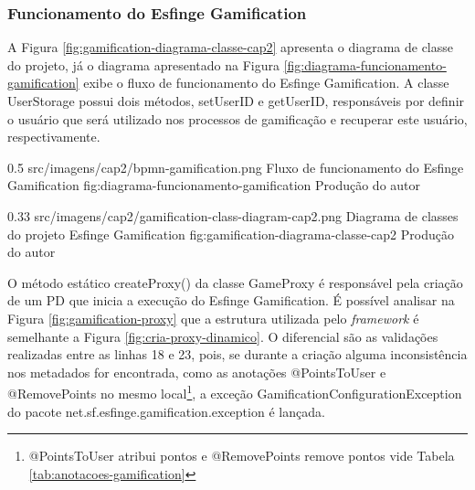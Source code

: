 \subsubsection{Funcionamento do Esfinge Gamification}

\par A Figura \ref{fig:gamification-diagrama-classe-cap2} apresenta o diagrama de classe do projeto, já o diagrama apresentado na Figura \ref{fig:diagrama-funcionamento-gamification} exibe o fluxo de funcionamento do Esfinge Gamification. A classe 
UserStorage possui dois métodos, setUserID e getUserID, responsáveis por definir o usuário que será utilizado nos processos de gamificação e recuperar este usuário, respectivamente.

\begin{image}
{0.5} %
{src/imagens/cap2/bpmn-gamification.png} %
{Fluxo de funcionamento do Esfinge Gamification} %
{fig:diagrama-funcionamento-gamification} %
{Produção do autor} %
\end{image}

\begin{image}
{0.33} %
{src/imagens/cap2/gamification-class-diagram-cap2.png} %
{Diagrama de classes do projeto Esfinge Gamification} %
{fig:gamification-diagrama-classe-cap2} %
{Produção do autor} %
\end{image}

\par O método estático createProxy() da classe GameProxy é responsável pela criação de um PD que inicia a execução do Esfinge Gamification. É possível analisar na Figura \ref{fig:gamification-proxy} que a estrutura utilizada pelo \textit{framework} é semelhante a Figura \ref{fig:cria-proxy-dinamico}. O diferencial são as validações realizadas entre as linhas 18 e 23, pois, se durante a criação alguma inconsistência nos metadados for encontrada, como as anotações @PointsToUser e  @RemovePoints no mesmo local\footnote{@PointsToUser atribui pontos e @RemovePoints remove pontos vide Tabela \ref{tab:anotacoes-gamification}}, a exceção GamificationConfigurationException do pacote net.sf.esfinge.gamification.exception é lançada. 

